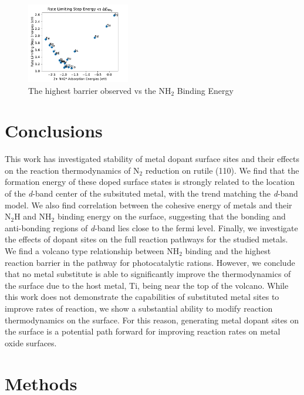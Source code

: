 \begin{figure}
    \centering
    \includegraphics[width=0.4\textwidth]{Images/NH2_v_rate_limiting.pdf}
    
    \caption{The highest barrier observed vs the NH$_2$ Binding Energy}
    \label{fig:NH2_limiting_bar}
\end{figure}

\section{Conclusions}
This work has investigated stability of metal dopant surface sites and their effects on the reaction thermodynamics of N$_2$ reduction on rutile (110). We find that the formation energy of these doped surface states is strongly related to the location of the \textit{d}-band center of the subsituted metal, with the trend matching the \textit{d}-band model. We also find correlation between the cohesive energy of metals and their N$_2$H and NH$_2$ binding energy on the surface, suggesting that the bonding and anti-bonding regions of \textit{d}-band lies close to the fermi level. Finally, we investigate the effects of dopant sites on the full reaction pathways for the studied metals. We find a volcano type relationship between NH$_2$ binding and the highest reaction barrier in the pathway for photocatalytic rations. However, we conclude that no metal substitute is able to significantly improve the thermodynamics of the surface due to the host metal, Ti, being near the top of the volcano. While this work does not demonstrate the capabilities of substituted metal sites to improve rates of reaction, we show a substantial ability to modify reaction thermodynamics on the surface. For this reason, generating metal dopant sites on the surface is a potential path forward for improving reaction rates on metal oxide surfaces.


\section{Methods}
\label{sec:methods}


